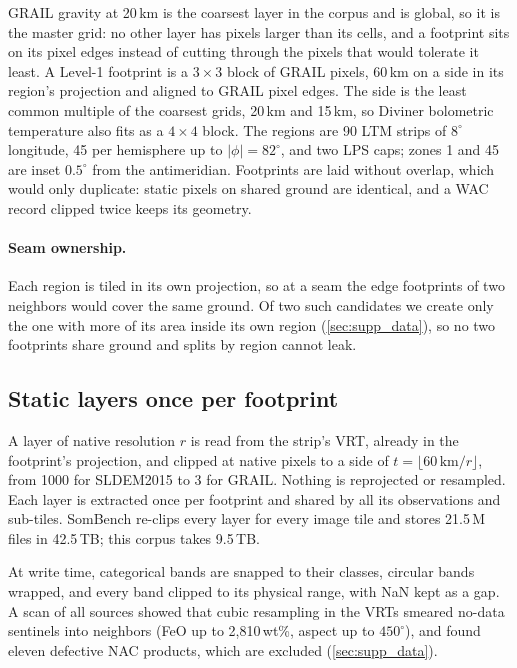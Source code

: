 GRAIL gravity at 20\,km is the coarsest layer in the corpus and is global, so it is the master grid: no other layer has pixels larger than its cells, and a footprint sits on its pixel edges instead of cutting through the pixels that would tolerate it least. A Level-1 footprint is a $3\times3$ block of GRAIL pixels, 60\,km on a side in its region's projection and aligned to GRAIL pixel edges. The side is the least common multiple of the coarsest grids, 20\,km and 15\,km, so Diviner bolometric temperature also fits as a $4\times4$ block. The regions are 90 LTM strips of $8^\circ$ longitude, 45 per hemisphere up to $|\phi|{=}82^\circ$, and two LPS caps; zones 1 and 45 are inset $0.5^\circ$ from the antimeridian. Footprints are laid without overlap, which would only duplicate: static pixels on shared ground are identical, and a WAC record clipped twice keeps its geometry.

\paragraph{Seam ownership.} Each region is tiled in its own projection, so at a seam the edge footprints of two neighbors would cover the same ground. Of two such candidates we create only the one with more of its area inside its own region (\cref{sec:supp_data}), so no two footprints share ground and splits by region cannot leak.

\subsection{Static layers once per footprint}
\label{sec:attach}

A layer of native resolution $r$ is read from the strip's VRT, already in the footprint's projection, and clipped at native pixels to a side of $t = \lfloor 60\,\text{km}/r \rfloor$, from 1000 for SLDEM2015 to 3 for GRAIL. Nothing is reprojected or resampled. Each layer is extracted once per footprint and shared by all its observations and sub-tiles. SomBench re-clips every layer for every image tile and stores 21.5\,M files in 42.5\,TB; this corpus takes 9.5\,TB.

At write time, categorical bands are snapped to their classes, circular bands wrapped, and every band clipped to its physical range, with NaN kept as a gap. A scan of all sources showed that cubic resampling in the VRTs smeared no-data sentinels into neighbors (FeO up to 2,810\,wt\%, aspect up to $450^\circ$), and found eleven defective NAC products, which are excluded (\cref{sec:supp_data}).

